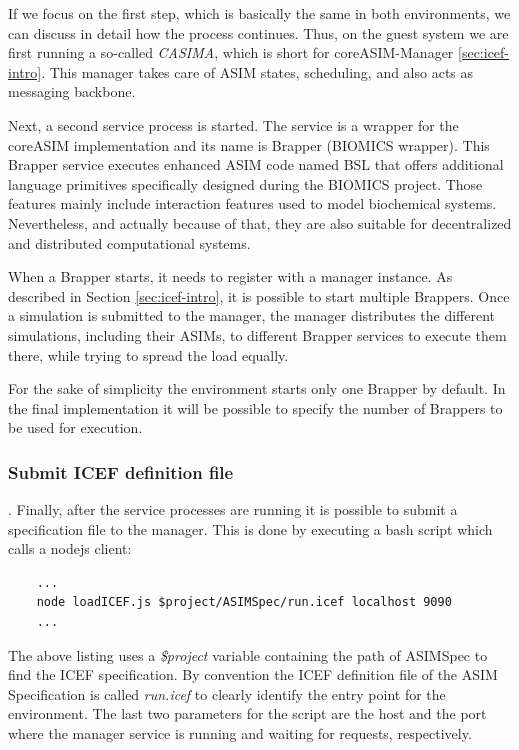If we focus on the first step, which is basically the same in both environments, we can discuss in detail how the process continues. Thus, on the guest system we are first running a so-called \textit{CASIMA}, which is short for coreASIM-Manager \ref{sec:icef-intro}. This manager takes care of ASIM states, scheduling, and also acts as messaging backbone.

Next, a second service process is started. The service is a wrapper for the coreASIM implementation and its name is Brapper (BIOMICS wrapper). This Brapper service executes enhanced ASIM code named BSL that offers additional language primitives specifically designed during the BIOMICS project. Those features mainly include interaction features used to model biochemical systems. Nevertheless, and actually because of that, they are also suitable for decentralized and distributed computational systems.

When a Brapper starts, it needs to register with a manager instance. As described in Section \ref{sec:icef-intro}, it is possible to start multiple Brappers. Once a simulation is submitted to the manager, the manager distributes the different simulations, including their ASIMs, to different Brapper services to execute them there, while trying to spread the load equally.

For the sake of simplicity the environment starts only one Brapper by default. In the final implementation it will be possible to specify the number of Brappers to be used for execution.

\subsubsection{Submit ICEF definition file}. Finally, after the service processes are running it is possible to submit a specification file to the manager. This is done by executing a bash script which calls a  nodejs client:

\begin{lstlisting}
	...
	node loadICEF.js $project/ASIMSpec/run.icef localhost 9090
	...
\end{lstlisting}

The above listing uses a \textit{\$project} variable containing the path of ASIMSpec to find the ICEF specification. By convention the ICEF definition file of the ASIM Specification is called \textit{run.icef} to clearly identify the entry point for the environment. The last two parameters for the script are the host and the port where the manager service is running and waiting for requests, respectively.

